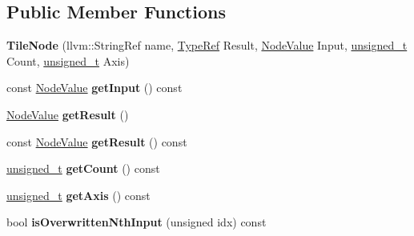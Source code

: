 \subsection*{Public Member Functions}
\begin{DoxyCompactItemize}
\item 
\mbox{\label{classglow_1_1_tile_node_a39db3704c882eb5f91d64fc9b385f462}} 
{\bfseries Tile\+Node} (llvm\+::\+String\+Ref name, \hyperlink{structglow_1_1_type}{Type\+Ref} Result, \hyperlink{structglow_1_1_node_value}{Node\+Value} Input, \hyperlink{namespaceglow_a0ca574644e1e42ef193a9947fb4d8911}{unsigned\+\_\+t} Count, \hyperlink{namespaceglow_a0ca574644e1e42ef193a9947fb4d8911}{unsigned\+\_\+t} Axis)
\item 
\mbox{\label{classglow_1_1_tile_node_abb4f35b9fa8b26df4f317094e862adba}} 
const \hyperlink{structglow_1_1_node_value}{Node\+Value} {\bfseries get\+Input} () const
\item 
\mbox{\label{classglow_1_1_tile_node_ad096bca19cfe021f79b4c826983ae168}} 
\hyperlink{structglow_1_1_node_value}{Node\+Value} {\bfseries get\+Result} ()
\item 
\mbox{\label{classglow_1_1_tile_node_a7029be384721da1339df9c0b98d68eaf}} 
const \hyperlink{structglow_1_1_node_value}{Node\+Value} {\bfseries get\+Result} () const
\item 
\mbox{\label{classglow_1_1_tile_node_ade1db5137786af3bbc9072f7cad53cd4}} 
\hyperlink{namespaceglow_a0ca574644e1e42ef193a9947fb4d8911}{unsigned\+\_\+t} {\bfseries get\+Count} () const
\item 
\mbox{\label{classglow_1_1_tile_node_a4aeae8ac09eafea954099e4987a0f11e}} 
\hyperlink{namespaceglow_a0ca574644e1e42ef193a9947fb4d8911}{unsigned\+\_\+t} {\bfseries get\+Axis} () const
\item 
\mbox{\label{classglow_1_1_tile_node_abb83ed5613f4e5950182856339d57c61}} 
bool {\bfseries is\+Overwritten\+Nth\+Input} (unsigned idx) const
\item 
\mbox{\label{classglow_1_1_tile_node_a95903dabde5ce5735367964bca425575}} 

\end{DoxyCompactItemize}
